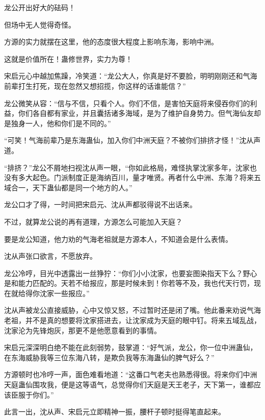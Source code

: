 
\begin{this_body}



龙公开出好大的砝码！

但场中无人觉得奇怪。

方源的实力就摆在这里，他的态度很大程度上影响东海，影响中洲。

这就是价值所在！蛊修世界，实力为尊！

宋启元心中越加焦躁，冷笑道：“龙公大人，你真是好不要脸，明明刚刚还和气海前辈打生打死，现在忽然又想招揽，你这样的话谁能信？”

龙公微笑从容：“信与不信，只看个人。你们不信，是害怕天庭将来侵吞你们的利益，你们各自都有家业，并且囊括诸多海域，是为了维护自身势力。但气海仙友却是独身一人，他和你们是不同的。”

“可笑！气海前辈乃是东海蛊仙，加入你们中洲天庭？不被你们排挤才怪！”沈从声道。

“排挤？”龙公不屑地扫视沈从声一眼，“你如此格局，难怪执掌沈家多年，沈家也没有多大起色。门派制度正是海纳百川，量才唯贤。再者什么中洲、东海？将来五域合一，天下蛊仙都是同一个地方的人。”

龙公口才了得，一时间把宋启元、沈从声都驳得说不出话来。

不过，就算龙公说的再有道理，方源怎么可能加入天庭？

要是龙公知道，他力劝的气海老祖就是方源本人，不知道会是什么表情。

沈从声张口欲言，不愿放弃。

龙公冷哼，目光中透露出一丝狰狞：“你们小小沈家，也要妄图染指天下么？野心是和能力匹配的。天若不给报应，那是时候未到！你若等不及，我也代天行罚，现在就给得你沈家一些报应。”

沈从声被龙公直接威胁，心中又惊又怒，不过暂时还是闭了嘴。他此番来劝说气海老祖，并不是真的想要将沈家搭进去，让沈家成为天庭的眼中钉。将来五域乱战，沈家沦为先锋炮灰，那更不是他愿意看到的事情。

宋启元深深明白绝不能在此刻弱势，鼓掌道：“好气派，龙公，你一位中洲蛊仙，在东海威胁我等三位东海八转，是欺负我等东海蛊仙的脾气好么？”

方源顿时也冷哼一声，面色难看地道：“这番口气老夫也熟悉得很。将来你们中洲天庭蛊仙围攻我，便是这等语气，总觉得你们天庭是天王老子，天下第一，谁都应该臣服于你们。”

此言一出，沈从声、宋启元立即精神一振，腰杆子顿时挺得笔直起来。


\end{this_body}
